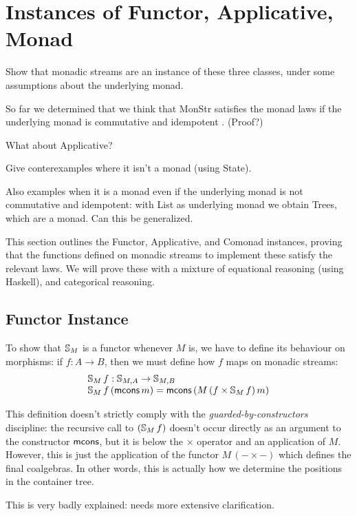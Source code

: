 
\section{Instances of Functor, Applicative, Monad}

Show that monadic streams are an instance of these three classes, under some assumptions about the underlying monad.

So far we determined that we think that MonStr satisfies the monad laws if the underlying monad is commutative and idempotent \cite{idempotent_monads}. (Proof?)

What about Applicative?

Give conterexamples where it isn't a monad (using State).

Also examples when it is a monad even if the underlying monad is not commutative and idempotent: with List as underlying monad we obtain Trees, which are a monad. Can this be generalized.

This section outlines the Functor, Applicative, and Comonad instances, proving that the functions defined on monadic streams to implement these satisfy the relevant laws. We will prove these with a mixture of equational reasoning (using Haskell), and categorical reasoning.

\subsection{Functor Instance}

To show that $\mathbb{S}_{M}$ is a functor whenever $M$ is, we have to define its behaviour on morphisms: if $f:A\rightarrow B$, then we must define how $f$ maps on monadic streams:
$$
\begin{array}{l}
\mathbb{S}_{M}\,f : \mathbb{S}_{M,A} \rightarrow \mathbb{S}_{M,B}\\
\mathbb{S}_{M}\,f\,(\mathsf{mcons}\,m) = \mathsf{mcons}\,(M\,(f\times \mathbb{S}_{M}\,f)\,m)
\end{array}
$$

This definition doesn't strictly comply with the {\em guarded-by-constructors} discipline: the recursive call to $(\mathbb{S}_{M}\,f)$ doesn't occur directly as an argument to the constructor $\mathsf{mcons}$, but it is below the $\times$ operator and an application of $M$.
However, this is just the application of the functor $M\,(- \times -)$ which defines the final coalgebras. In other words, this is actually how we determine the positions in the container tree.
\begin{vcomment}
	This is very badly explained: needs more extensive clarification.
\end{vcomment}
















